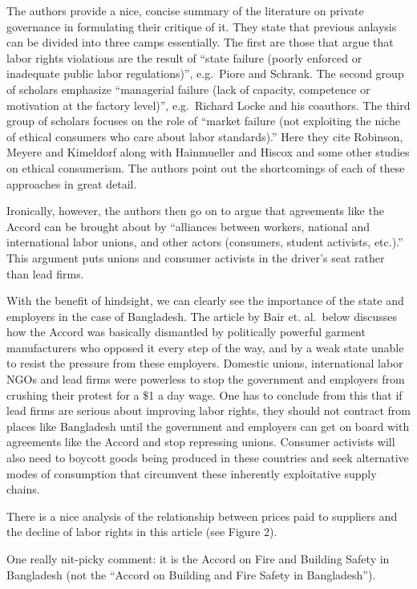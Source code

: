 \documentclass[
  12pt,
]{article}
\begin{document}
The authors provide a nice, concise summary of the literature on private
governance in formulating their critique of it. They state that previous
anlaysis can be divided into three camps essentially. The first are
those that argue that labor rights violations are the result of ``state
failure (poorly enforced or inadequate public labor regulations)'',
e.g.~Piore and Schrank. The second group of scholars emphasize
``managerial failure (lack of capacity, competence or motivation at the
factory level)'', e.g.~Richard Locke and his coauthors. The third group
of scholars focuses on the role of ``market failure (not exploiting the
niche of ethical consumers who care about labor standards).'' Here they
cite Robinson, Meyere and Kimeldorf along with Hainmueller and Hiscox
and some other studies on ethical consumerism. The authors point out the
shortcomings of each of these approaches in great detail.

Ironically, however, the authors then go on to argue that agreements
like the Accord can be brought about by ``alliances between workers,
national and international labor unions, and other actors (consumers,
student activists, etc.).'' This argument puts unions and consumer
activists in the driver's seat rather than lead firms.

With the benefit of hindsight, we can clearly see the importance of the
state and employers in the case of Bangladesh. The article by Bair et.
al.~below discusses how the Accord was basically dismantled by
politically powerful garment manufacturers who opposed it every step of
the way, and by a weak state unable to resist the pressure from these
employers. Domestic unions, international labor NGOs and lead firms were
powerless to stop the government and employers from crushing their
protest for a \$1 a day wage. One has to conclude from this that if lead
firms are serious about improving labor rights, they should not contract
from places like Bangladesh until the government and employers can get
on board with agreements like the Accord and stop repressing unions.
Consumer activists will also need to boycott goods being produced in
these countries and seek alternative modes of consumption that
circumvent these inherently exploitative supply chains.

There is a nice analysis of the relationship between prices paid to
suppliers and the decline of labor rights in this article (see Figure
2).

One really nit-picky comment: it is the Accord on Fire and Building
Safety in Bangladesh (not the ``Accord on Building and Fire Safety in
Bangladesh'').
\end{document}
